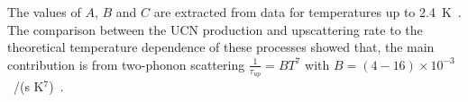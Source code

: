 The values of $A$, $B$ and $C$ are extracted from data for
temperatures up to 2.4~K~\cite{Leung2016}. The comparison between
the UCN production and upscattering rate to the theoretical
temperature dependence of these processes showed that, the main
contribution is from two-phonon scattering $\frac{1}{\tau_{up}}=BT^7$
with $B=(4-16)\times 10^{-3}$~/(s K$^7$)~\cite{Leung2016}.











